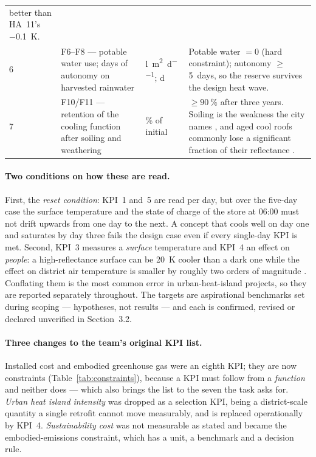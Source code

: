 \begin{table}[htbp]
\begin{tabularx}{\textwidth}{L{0.4cm} L{4.3cm} L{1.4cm} X}
    better than HA~11's \qty{-0.1}{\kelvin}. \\
6 & F6--F8 --- potable water use; days of autonomy on harvested rainwater
  & \unit{\litre\per\square\metre\per\day}; d
  & Potable water $= 0$ (hard constraint); autonomy $\geq$ \qty{5}{days}, so the
    reserve survives the design heat wave.  \\
7 & F10/F11 --- retention of the cooling function after soiling and weathering
  & \unit{\percent} of initial
  & $\geq \qty{90}{\percent}$ after three years. Soiling is the weakness the
    city names \parencite[128]{stadtzuerich2020}, and aged cool roofs commonly
    lose a significant fraction of their reflectance
    \parencite{santamouris2014}. \\
\bottomrule
\end{tabularx}
\end{table}

\paragraph{Two conditions on how these are read.} First, the \emph{reset
condition}: KPI~1 and~5 are read per day, but over the five-day case the surface
temperature and the state of charge of the store at 06:00 must not drift upwards
from one day to the next. A concept that cools well on day one and saturates by
day three fails the design case even if every single-day KPI is met.
 Second, KPI~3 measures a
\emph{surface} temperature and KPI~4 an effect on \emph{people}: a
high-reflectance surface can be \qty{20}{\kelvin} cooler than a dark one while
the effect on district air temperature is smaller by roughly two orders of
magnitude \parencite{santamouris2014,akbari2009}. Conflating them is the most
common error in urban-heat-island projects, so they are reported separately
throughout. The targets are aspirational benchmarks set during scoping ---
hypotheses, not results --- and each is confirmed, revised or declared unverified
in Section~3.2. 

\paragraph{Three changes to the team's original KPI list.} Installed cost and
embodied greenhouse gas were an eighth KPI; they are now constraints
(Table~\ref{tab:constraints}), because a KPI must follow from a \emph{function}
and neither does --- which also brings the list to the seven the task asks for.
\emph{Urban heat island intensity} was dropped as a selection KPI, being a
district-scale quantity a single retrofit cannot move measurably, and is
replaced operationally by KPI~4. \emph{Sustainability cost} was not measurable
as stated and became the embodied-emissions constraint, which has a unit, a
benchmark and a decision rule.

